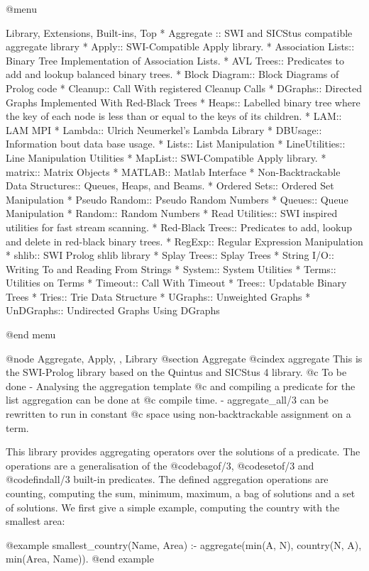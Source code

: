 {{{{{{{{{@menu
 
Library, Extensions, Built-ins, Top
* Aggregate :: SWI and SICStus compatible aggregate library
* Apply:: SWI-Compatible Apply library.
* Association Lists:: Binary Tree Implementation of Association Lists.
* AVL Trees:: Predicates to add and lookup balanced binary  trees.
* Block Diagram:: Block Diagrams of Prolog code
* Cleanup:: Call With registered Cleanup Calls
* DGraphs:: Directed Graphs Implemented With Red-Black Trees
* Heaps:: Labelled binary tree where the key of each node is less
    than or equal to the keys of its children.
* LAM:: LAM MPI
* Lambda:: Ulrich Neumerkel's Lambda Library
* DBUsage:: Information bout data base usage.
* Lists:: List Manipulation
* LineUtilities:: Line Manipulation Utilities
* MapList:: SWI-Compatible Apply library.
* matrix:: Matrix Objects
* MATLAB:: Matlab Interface
* Non-Backtrackable Data Structures:: Queues, Heaps, and Beams.
* Ordered Sets:: Ordered Set Manipulation
* Pseudo Random:: Pseudo Random Numbers
* Queues:: Queue Manipulation
* Random:: Random Numbers
* Read Utilities:: SWI inspired utilities for fast stream scanning.
* Red-Black Trees:: Predicates to add, lookup and delete in red-black binary  trees.
* RegExp:: Regular Expression Manipulation
* shlib:: SWI Prolog shlib library
* Splay Trees:: Splay Trees
* String I/O:: Writing To and Reading From Strings
* System:: System Utilities
* Terms:: Utilities on Terms
* Timeout:: Call With Timeout
* Trees:: Updatable Binary Trees
* Tries:: Trie Data Structure
* UGraphs:: Unweighted Graphs
* UnDGraphs:: Undirected Graphs Using DGraphs


@end menu

 
@node Aggregate, Apply, , Library
@section Aggregate
@cindex aggregate
This is the SWI-Prolog library based on  the Quintus and SICStus 4
library.   @c To be done - Analysing the aggregation template
@c and compiling a predicate for the list aggregation can be done at
@c compile time.  - aggregate_all/3 can be rewritten to run in constant
@c space using non-backtrackable assignment on a term.

This library provides aggregating operators over the solutions of a
predicate. The operations are a generalisation of the @code{bagof/3},
@code{setof/3} and @code{findall/3} built-in predicates. The defined
aggregation operations are counting, computing the sum, minimum,
maximum, a bag of solutions and a set of solutions. We first give a
simple example, computing the country with the smallest area:

@example
smallest_country(Name, Area) :-
        aggregate(min(A, N), country(N, A), min(Area, Name)).
@end example

}}}}}}}}}
